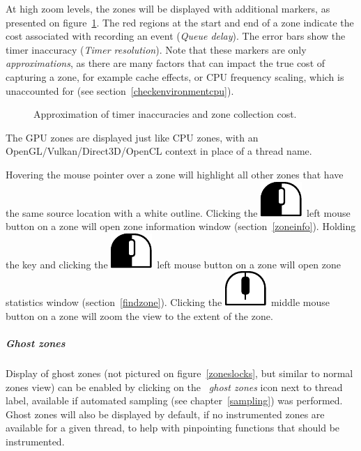 \documentclass[hidelinks,titlepage,a4paper]{article}
\newcommand{\LMB}{\includegraphics[height=.8\baselineskip]{icons/lmb}}
\newcommand{\MMB}{\includegraphics[height=.8\baselineskip]{icons/mmb}}
\begin{document}
At high zoom levels, the zones will be displayed with additional markers, as presented on figure~\ref{inaccuracy}. The red regions at the start and end of a zone indicate the cost associated with recording an event (\emph{Queue delay}). The error bars show the timer inaccuracy (\emph{Timer resolution}). Note that these markers are only \emph{approximations}, as there are many factors that can impact the true cost of capturing a zone, for example cache effects, or CPU frequency scaling, which is unaccounted for (see section~\ref{checkenvironmentcpu}).

\begin{figure}[h]
\centering{}
\caption{Approximation of timer inaccuracies and zone collection cost.}
\label{inaccuracy}
\end{figure}

The GPU zones are displayed just like CPU zones, with an OpenGL/Vulkan/Direct3D/OpenCL context in place of a thread name.

Hovering the \faMousePointer{} mouse pointer over a zone will highlight all other zones that have the same source location with a white outline. Clicking the \LMB{}~left mouse button on a zone will open zone information window (section~\ref{zoneinfo}). Holding the \keys{\ctrl} key and clicking the \LMB{}~left mouse button on a zone will open zone statistics window (section~\ref{findzone}). Clicking the \MMB{}~middle mouse button on a zone will zoom the view to the extent of the zone.

\subparagraph{Ghost zones}

Display of ghost zones (not pictured on figure~\ref{zoneslocks}, but similar to normal zones view) can be enabled by clicking on the \emph{\faGhost{}~ghost zones} icon next to thread label, available if automated sampling (see chapter~\ref{sampling}) was performed. Ghost zones will also be displayed by default, if no instrumented zones are available for a given thread, to help with pinpointing functions that should be instrumented.
\end{document}
